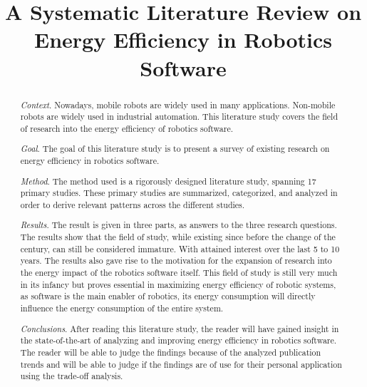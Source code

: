 \documentclass[10pt, conference, compsocconf]{IEEEtran}
\begin{document}
\title{
	{A Systematic Literature Review on Energy Efficiency in Robotics Software}
}

\author{

\vspace{5mm}

}


\maketitle

\begin{abstract}
\noindent \textit{Context}. 
Nowadays, mobile robots are widely used in many applications. Non-mobile robots are widely used in industrial automation.
This literature study covers the field of research into the energy efficiency of robotics software.

\noindent \textit{Goal}. 
The goal of this literature study is to present a survey of existing research on energy efficiency in robotics software.

\noindent \textit{Method}. 
The method used is a rigorously designed literature study, spanning 17 primary studies. 
These primary studies are summarized, categorized, and analyzed in order to derive relevant patterns across the different studies.

\noindent \textit{Results}. 
The result is given in three parts, as answers to the three research questions. 
The results show that the field of study, while existing since before the change of the century, can still be considered immature.
With attained interest over the last 5 to 10 years.
The results also gave rise to the motivation for the expansion of research into the energy impact of the robotics software itself.
This field of study is still very much in its infancy but proves essential in maximizing energy efficiency of robotic systems, 
as software is the main enabler of robotics, its energy consumption will directly inﬂuence the energy consumption of the entire system.

\noindent \textit{Conclusions}.
After reading this literature study, the reader will have gained insight in the state-of-the-art of analyzing and 
improving energy efficiency in robotics software. The reader will be able to judge the findings because of the analyzed publication trends
and will be able to judge if the findings are of use for their personal application using the trade-off analysis.
\end{abstract}
\end{document}
